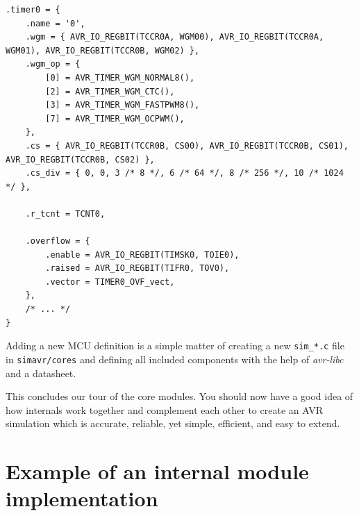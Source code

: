 \begin{lstlisting}
.timer0 = {
    .name = '0',
    .wgm = { AVR_IO_REGBIT(TCCR0A, WGM00), AVR_IO_REGBIT(TCCR0A, WGM01), AVR_IO_REGBIT(TCCR0B, WGM02) },
    .wgm_op = {
        [0] = AVR_TIMER_WGM_NORMAL8(),
        [2] = AVR_TIMER_WGM_CTC(),
        [3] = AVR_TIMER_WGM_FASTPWM8(),
        [7] = AVR_TIMER_WGM_OCPWM(),
    },
    .cs = { AVR_IO_REGBIT(TCCR0B, CS00), AVR_IO_REGBIT(TCCR0B, CS01), AVR_IO_REGBIT(TCCR0B, CS02) },
    .cs_div = { 0, 0, 3 /* 8 */, 6 /* 64 */, 8 /* 256 */, 10 /* 1024 */ },

    .r_tcnt = TCNT0,

    .overflow = {
        .enable = AVR_IO_REGBIT(TIMSK0, TOIE0),
        .raised = AVR_IO_REGBIT(TIFR0, TOV0),
        .vector = TIMER0_OVF_vect,
    },
    /* ... */
}
\end{lstlisting}

Adding a new \ac{MCU} definition is a simple matter of creating a new \verb|sim_*.c|
file in \verb|simavr/cores| and defining all included components with the help
of \emph{avr-libc} and a datasheet.

This concludes our tour of the \simavr core modules. You should now have a
good idea of how \simavr internals work together and complement each
other to create an \ac{AVR} simulation which is accurate, reliable, yet simple,
efficient, and easy to extend.


\section{Example of an internal module implementation} %

